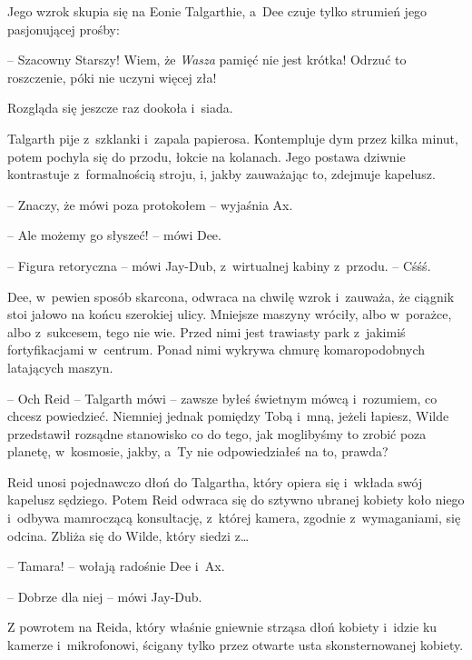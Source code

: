 \documentclass[oneside,polish,11pt,sfheadings]{mwbk}
\begin{document}
Jego wzrok skupia się na Eonie Talgarthie, a~Dee czuje tylko strumień
jego pasjonującej prośby: 

-- Szacowny Starszy! Wiem, że \emph{Wasza}
pamięć nie jest krótka! Odrzuć to roszczenie, póki nie uczyni więcej
zła!

Rozgląda się jeszcze raz dookoła i~siada.

Talgarth pije z~szklanki i~zapala papierosa. Kontempluje dym przez kilka
minut, potem pochyla się do przodu, łokcie na kolanach. Jego postawa
dziwnie kontrastuje z~formalnością stroju, i, jakby zauważając to,
zdejmuje kapelusz.

-- Znaczy, że mówi poza protokołem -- wyjaśnia Ax.

-- Ale możemy go słyszeć! -- mówi Dee.

-- Figura retoryczna -- mówi Jay-Dub, z~wirtualnej kabiny z~przodu. -- Cśśś.

Dee, w~pewien sposób skarcona, odwraca na chwilę wzrok i~zauważa, że
ciągnik stoi jałowo na końcu szerokiej ulicy. Mniejsze maszyny wróciły,
albo w~porażce, albo z~sukcesem, tego nie wie. Przed nimi jest trawiasty
park z~jakimiś fortyfikacjami w~centrum. Ponad nimi wykrywa chmurę
komaropodobnych latających maszyn.

-- Och Reid -- Talgarth mówi -- zawsze byłeś świetnym mówcą i~rozumiem, co
chcesz powiedzieć. Niemniej jednak pomiędzy Tobą i~mną, jeżeli łapiesz,
Wilde przedstawił rozsądne stanowisko co do tego, jak moglibyśmy to
zrobić poza planetę, w~kosmosie, jakby, a~Ty nie odpowiedziałeś na to,
prawda?

Reid unosi pojednawczo dłoń do Talgartha, który opiera się i~wkłada swój
kapelusz sędziego. Potem Reid odwraca się do sztywno ubranej kobiety
koło niego i~odbywa mamroczącą konsultację, z~której kamera, zgodnie z~wymaganiami, się odcina. Zbliża się do Wilde, który siedzi z\ldots

-- Tamara! -- wołają radośnie Dee i~Ax.

-- Dobrze dla niej -- mówi Jay-Dub.

Z powrotem na Reida, który właśnie gniewnie strząsa dłoń kobiety i~idzie
ku kamerze i~mikrofonowi, ścigany tylko przez otwarte usta
skonsternowanej kobiety.
\end{document}

